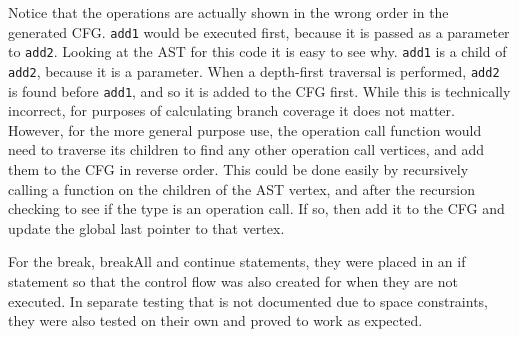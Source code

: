Notice that the operations are actually shown in the wrong order in the generated CFG. \verb|add1| would be executed first, because it is passed as a parameter to \verb|add2|. Looking at the AST for this code it is easy to see why. \verb|add1| is a child of \verb|add2|, because it is a parameter. When a depth-first traversal is performed, \verb|add2| is found before \verb|add1|, and so it is added to the CFG first. While this is technically incorrect, for purposes of calculating branch coverage it does not matter. However, for the more general purpose use, the operation call function would need to traverse its children to find any other operation call vertices, and add them to the CFG in reverse order. This could be done easily by recursively calling a function on the children of the AST vertex, and after the recursion checking to see if the type is an operation call. If so, then add it to the CFG and update the global last pointer to that vertex.

\begin{figure}
\centering
\begin{minipage}{.25\textwidth}
  \centering
  \caption{}
  \label{fig:testBreak}
\end{minipage}%
\begin{minipage}{.25\textwidth}
  \centering
  \caption{}
  \label{fig:testBreakAll}
\end{minipage}%
\begin{minipage}{.25\textwidth}
  \centering
    \caption{}
  	\label{fig:testContinue}
\end{minipage}
\end{figure}
For the break, breakAll and continue statements, they were placed in an if statement so that the control flow was also created for when they are not executed. In separate testing that is not documented due to space constraints, they were also tested on their own and proved to work as expected.

